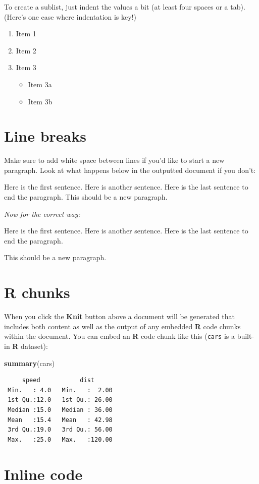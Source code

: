 \documentclass[12pt,twoside]{reedthesis}
\newenvironment{Shaded}{\begin{snugshade}}{\end{snugshade}}
\newcommand{\KeywordTok}[1]{\textcolor[rgb]{0.13,0.29,0.53}{\textbf{#1}}}
\newcommand{\NormalTok}[1]{#1}
\providecommand{\tightlist}{%
  \setlength{\itemsep}{0pt}\setlength{\parskip}{0pt}}
\begin{document}
To create a sublist, just indent the values a bit (at least four spaces or a tab). (Here's one case where indentation is key!)
\begin{enumerate}
\def\labelenumi{\arabic{enumi}.}
\tightlist
\item
  Item 1
\item
  Item 2
\item
  Item 3
  \begin{itemize}
  \tightlist
  \item
    Item 3a
  \item
    Item 3b
  \end{itemize}
\end{enumerate}
\hypertarget{line-breaks}{%
\section{Line breaks}\label{line-breaks}}

Make sure to add white space between lines if you'd like to start a new paragraph. Look at what happens below in the outputted document if you don't:

Here is the first sentence. Here is another sentence. Here is the last sentence to end the paragraph.
This should be a new paragraph.

\emph{Now for the correct way:}

Here is the first sentence. Here is another sentence. Here is the last sentence to end the paragraph.

This should be a new paragraph.

\hypertarget{r-chunks}{%
\section{R chunks}\label{r-chunks}}

When you click the \textbf{Knit} button above a document will be generated that includes both content as well as the output of any embedded \textbf{R} code chunks within the document. You can embed an \textbf{R} code chunk like this (\texttt{cars} is a built-in \textbf{R} dataset):
\begin{Shaded}
\begin{Highlighting}[]
\KeywordTok{summary}\NormalTok{(cars)}
\end{Highlighting}
\end{Shaded}
\begin{verbatim}
     speed           dist       
 Min.   : 4.0   Min.   :  2.00  
 1st Qu.:12.0   1st Qu.: 26.00  
 Median :15.0   Median : 36.00  
 Mean   :15.4   Mean   : 42.98  
 3rd Qu.:19.0   3rd Qu.: 56.00  
 Max.   :25.0   Max.   :120.00  
\end{verbatim}
\hypertarget{inline-code}{%
\section{Inline code}\label{inline-code}}
\end{document}
